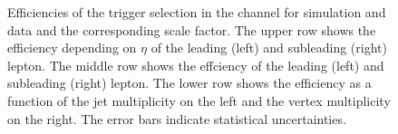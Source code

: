 \begin{figure}[htbp!]
\begin{center}
      \caption{Efficiencies of the trigger selection in the \ee channel for simulation and data and the corresponding scale factor. The upper row shows the efficiency depending on $\eta$ of the leading (left) and subleading (right) lepton. The middle row shows the effciency \pt of the leading (left) and subleading (right) lepton. The lower row shows the efficiency as a function of the jet multiplicity on the left and the vertex multiplicity on the right.
       The error bars indicate statistical uncertainties. }  
      
    \label{fig:MET_ee}
  \end{center}
\end{figure}

\begin{figure}[htbp!]
  \begin{center}

\end{center}
\end{figure}
